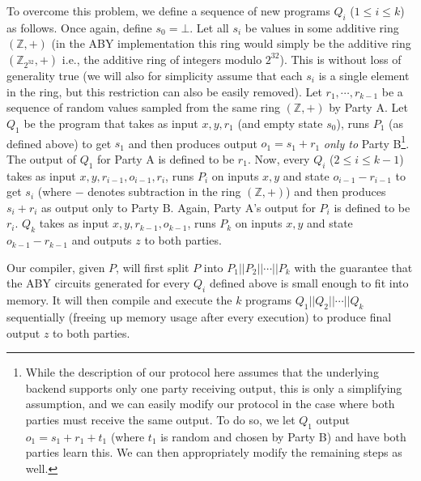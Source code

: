To overcome this problem, we define a sequence of new programs $Q_i$ ($1\leq i\leq k$) as follows. Once again, define $s_0 = \bot$. Let all $s_i$ be values in some additive ring $(\mathbb{Z},+)$ (in the ABY implementation this ring would simply be the additive ring $(\mathbb{Z}_{2^{32}},+)$ i.e., the additive ring of integers modulo $2^{32}$). This is without loss of generality true (we will also for simplicity assume that each $s_i$ is a single element in the ring, but this restriction can also be easily removed). Let $r_1,\cdots,r_{k-1}$ be a sequence of random values sampled from the same ring $(\mathbb{Z},+)$ by Party A. Let $Q_1$ be the program that takes as input $x,y, r_1$ (and empty state $s_0$), runs $P_1$ (as defined above) to get $s_1$ and then produces output $o_1 = s_1 + r_1$ {\em only to} Party B\footnote{While the description of our protocol here assumes that the underlying backend supports only one party receiving output, this is only a simplifying assumption, and we can easily modify our protocol in the case where both parties must receive the same output. To do so, we let $Q_1$ output $o_1 = s_1+r_1+t_1$ (where $t_1$ is random and chosen by Party B) and have both parties learn this. We can then appropriately modify the remaining steps as well.}. The output of $Q_1$ for Party A is defined to be $r_1$. Now, every $Q_i$ ($2\leq i\leq k-1$) takes as input $x,y,r_{i-1},o_{i-1},r_i$, runs $P_i$ on inputs $x,y$ and state $o_{i-1}-r_{i-1}$ to get $s_i$ (where $-$ denotes subtraction in the ring $(\mathbb{Z},+)$) and then produces $s_i+r_i$ as output only to Party B. Again, Party A's output for $P_i$ is defined to be $r_i$. $Q_k$ takes as input $x,y,r_{k-1},o_{k-1}$, runs $P_k$ on inputs $x,y$ and state $o_{k-1}-r_{k-1}$ and outputs $z$ to both parties.

Our compiler, given $P$, will first split $P$ into $P_1||P_2||\cdots||P_k$ with the guarantee that the ABY circuits generated for every $Q_i$ defined above is small enough to fit into memory. It will then compile and execute the $k$ programs $Q_1||Q_2||\cdots||Q_k$ sequentially (freeing up memory usage after every execution) to produce final output $z$ to both parties.